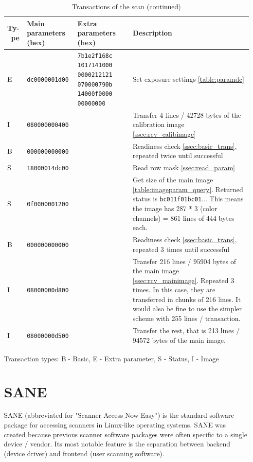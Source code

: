 \documentclass{article}
\begin{document}
\begin{table}[H]
  \caption{Transactions of the scan (continued)}
  \centering
  \begin{tabular}{p{0.4cm} | p{2.3cm} | p{2cm} | p{5cm}}
    Ty-\ pe & Main parameters (hex) & Extra parameters (hex) & Description \\ \hline
    E & {\tt dc0000001d00} & \tt 7b1e2f168c 1017141000 0000212121 070000790b 14000f0000 00000000
                           & Set exposure settings \autoref{table:paramdc} \\
    I & {\tt 080000000400} &  & Transfer 4 lines / 42728 bytes of the calibration image \ref{ssec:rcv_calibimage} \\
    B & {\tt 000000000000} &  & Readiness check \ref{ssec:basic_trans}, repeated twice until successful \\
    S & {\tt 18000014dc00} &  & Read row mask \ref{ssec:read_param} \\
    S & {\tt 0f0000001200} &  & Get size of the main image \autoref{table:imageparam_query}.
                                Returned status is {\tt bc011f01bc01}... This means the
                                image has 287 * 3 (color channels) = 861 lines of 444 bytes each. \\
    B & {\tt 000000000000} &  & Readiness check \ref{ssec:basic_trans}, repeated 3 times until successful \\
    I & {\tt 08000000d800} &  & Transfer 216 lines / 95904 bytes of the main image \ref{ssec:rcv_mainimage}.
                                Repeated 3 times.
                                In this case, they are transferred in chunks of 216 lines. It would also
                                be fine to use the simpler scheme with 255 lines / transaction. \\
    I & {\tt 08000000d500} &  & Transfer the rest, that is 213 lines / 94572 bytes of the main image. \\
  \end{tabular}
  
  \vspace{5mm} Transaction types: B - Basic, E - Extra parameter,
               S - Status, I - Image
\end{table}

\section{SANE}

SANE (abbreviated for "Scanner Access Now Easy") is the standard software package
for accessing scanners in Linux-like operating systems. SANE was created
because previous scanner software packages were often specific to a single device / vendor.
Its most notable feature is the separation between backend (device driver) 
and frontend (user scanning software).
\end{document}
